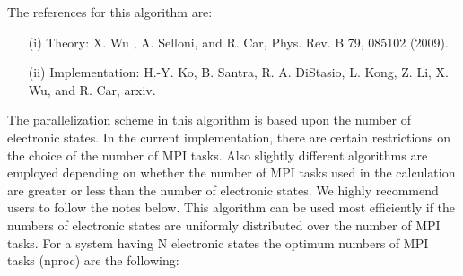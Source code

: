 \documentclass[12pt,a4paper]{article}
\begin{document}
The references for this algorithm are:
\begin{itemize}
  \item[(i)] Theory: X. Wu , A. Selloni, and R. Car, Phys. Rev. B 79, 085102 (2009).
  \item[(ii)] Implementation: H.-Y. Ko, B. Santra, R. A. DiStasio, L. Kong, Z. Li, X. Wu, and R. Car, arxiv.
\end{itemize}

The parallelization scheme in this algorithm is based upon the number of electronic states. 
In the current implementation, there are certain restrictions on the choice of the number of MPI tasks.
Also slightly different algorithms are employed depending on whether the number of MPI tasks used in the calculation are greater or less than the number of electronic states.
We highly recommend users to follow the notes below.
This algorithm can be used most efficiently if the numbers of electronic states are uniformly distributed over the number of MPI tasks. 
For a system having N electronic states the optimum numbers of MPI tasks (nproc) are the following:
\end{document}
